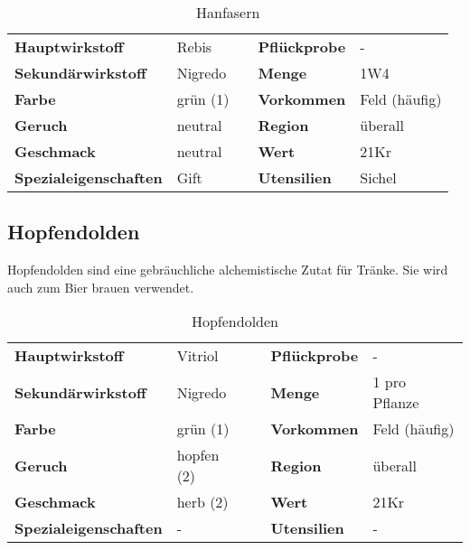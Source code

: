 \begin{table}[h] 
\begin{center} 
\begin{tabular}{|l|l|p{1cm}|l|l|} 
  	\cline{1-2} \cline{4-5} 
  	\textbf{Hauptwirkstoff} & Rebis && \textbf{Pflückprobe} & - \\ \cline{1-2} \cline{4-5} 
  	\textbf{Sekundärwirkstoff} & Nigredo && \textbf{Menge} & 1W4 \\ \cline{1-2} \cline{4-5} 
  	\textbf{Farbe} & grün (1) && \textbf{Vorkommen} & Feld (häufig) \\ \cline{1-2} \cline{4-5} 
  	\textbf{Geruch} & neutral && \textbf{Region} & überall \\ \cline{1-2} \cline{4-5} 
  	\textbf{Geschmack} & neutral && \textbf{Wert} & 21Kr \\ \cline{1-2} \cline{4-5} 
  	\textbf{Spezialeigenschaften} & Gift && \textbf{Utensilien} & Sichel \\ \cline{1-2} \cline{4-5} 
\end{tabular} 
\end{center} 
\caption{Hanfasern} 
\label{tab:hanfasern} 
\end{table}


\subsection{Hopfendolden}
Hopfendolden sind eine gebräuchliche alchemistische Zutat für Tränke. Sie wird auch zum Bier brauen verwendet.

\begin{table}[h] 
\begin{center} 
\begin{tabular}{|l|l|p{1cm}|l|l|} 
  	\cline{1-2} \cline{4-5} 
  	\textbf{Hauptwirkstoff} & Vitriol && \textbf{Pflückprobe} & - \\ \cline{1-2} \cline{4-5} 
  	\textbf{Sekundärwirkstoff} & Nigredo && \textbf{Menge} & 1 pro Pflanze \\ \cline{1-2} \cline{4-5} 
  	\textbf{Farbe} & grün (1) && \textbf{Vorkommen} & Feld (häufig) \\ \cline{1-2} \cline{4-5} 
  	\textbf{Geruch} & hopfen (2) && \textbf{Region} & überall \\ \cline{1-2} \cline{4-5} 
  	\textbf{Geschmack} & herb (2) && \textbf{Wert} & 21Kr \\ \cline{1-2} \cline{4-5} 
  	\textbf{Spezialeigenschaften} & - && \textbf{Utensilien} & - \\ \cline{1-2} \cline{4-5} 
\end{tabular} 
\end{center} 
\caption{Hopfendolden} 
\label{tab:hopfendolden} 
\end{table}


